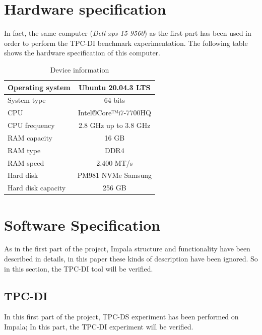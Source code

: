 \documentclass{article}
\newcommand\ita[1]{\textit{#1}}
\begin{document}
\section{Hardware specification}
In fact, the same computer (\ita{Dell xps-15-9560}) as the first part has been used in order to perform the TPC-DI benchmark experimentation. The following table shows the hardware specification of this computer. 
\newline
\begin{table}[h]
\centering
\begin{tabular}{|l|c|}
\hline
Operating system & Ubuntu 20.04.3 LTS \\ \hline
System type & 64 bits \\ \hline
CPU & Intel®Core™i7-7700HQ \\ \hline
CPU frequency & 2.8 GHz up to 3.8 GHz \\ \hline
RAM capacity & 16 GB \\ \hline
RAM type & DDR4 \\ \hline
RAM speed & 2,400 MT/s \\ \hline
Hard disk & PM981 NVMe Samsung \\ \hline
Hard disk capacity & 256 GB \\ \hline
\end{tabular}
\caption{Device information}
\label{table:Table 1}
\end{table}


\section{Software Specification}

As in the first part of the project, Impala structure and functionality have been described in details, in this paper these kinds of description have been ignored. So in this section, the TPC-DI tool will be verified.

\subsection{TPC-DI}
In this first part of the project, TPC-DS experiment has been performed on Impala; In this part, the TPC-DI experiment will be verified. 
\end{document}
